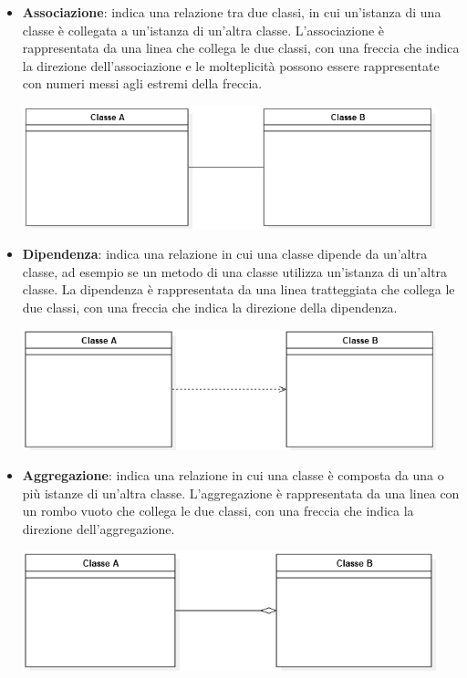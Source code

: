 \begin{itemize}
	\item \textbf{Associazione}: indica una relazione tra due classi, in cui un'istanza di una classe è collegata a un'istanza di un'altra classe. L'associazione è rappresentata da una linea che collega le due classi, con una freccia che indica la direzione dell'associazione e le molteplicità possono essere rappresentate con numeri messi agli estremi della freccia.
	\begin{center}
		\includegraphics*[width=12cm]{../../../images/norme_di_progetto/associazioneClassi.png}
	\end{center}
	\item \textbf{Dipendenza}: indica una relazione in cui una classe dipende da un'altra classe, ad esempio se un metodo di una classe utilizza un'istanza di un'altra classe. La dipendenza è rappresentata da una linea tratteggiata che collega le due classi, con una freccia che indica la direzione della dipendenza.
	\begin{center}
		\includegraphics*[width=12cm]{../../../images/norme_di_progetto/dipendenzaClassi.png}
	\end{center}
	\newpage
	\item \textbf{Aggregazione}: indica una relazione in cui una classe è composta da una o più istanze di un'altra classe. L'aggregazione è rappresentata da una linea con un rombo vuoto che collega le due classi, con una freccia che indica la direzione dell'aggregazione.
	\begin{center}
		\includegraphics*[width=12cm]{../../../images/norme_di_progetto/aggregazioneClassi.png}

\end{center}
\end{itemize}
